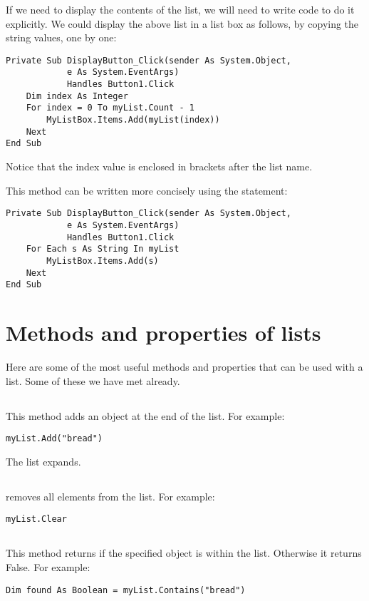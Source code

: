 		If we need to display the contents of the list, we will need to write code to do it explicitly. We could display the above list in a list box as follows, by copying the string values, one by one:
		\begin{lstlisting}
Private Sub DisplayButton_Click(sender As System.Object,
			e As System.EventArgs)
			Handles Button1.Click
	Dim index As Integer
	For index = 0 To myList.Count - 1
		MyListBox.Items.Add(myList(index))
	Next
End Sub
		\end{lstlisting}
		Notice that the index value is enclosed in brackets after the list name.
		
		This method can be written more concisely using the  statement:
		\begin{lstlisting}
Private Sub DisplayButton_Click(sender As System.Object,
			e As System.EventArgs)
			Handles Button1.Click
	For Each s As String In myList
		MyListBox.Items.Add(s)
	Next
End Sub
		\end{lstlisting}

		
	\section{Methods and properties of lists}
		Here are some of the most useful methods and properties that can be used with a list. Some of these we have met already.

		\subsection*{}
			This method adds an object at the end of the list. For example:
			\begin{lstlisting}
myList.Add("bread")
			\end{lstlisting}
			The list expands.

		\subsection*{}
			 removes all elements from the list. For example:
			\begin{lstlisting}
myList.Clear
			\end{lstlisting}

		\subsection*{}
			This method returns  if the specified object is within the list. Otherwise it returns False. For example:
			\begin{lstlisting}
Dim found As Boolean = myList.Contains("bread")
			\end{lstlisting}

